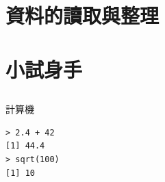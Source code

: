 \documentclass[12pt]{beamer}
\begin{document}
\section{資料的讀取與整理}\subsection{}


\section{小試身手}\subsection{}

\begin{frame}[fragile]{計算機}
\begin{verbatim}
> 2.4 + 42
[1] 44.4
> sqrt(100)
[1] 10
\end{verbatim}
\end{frame}
\end{document}
